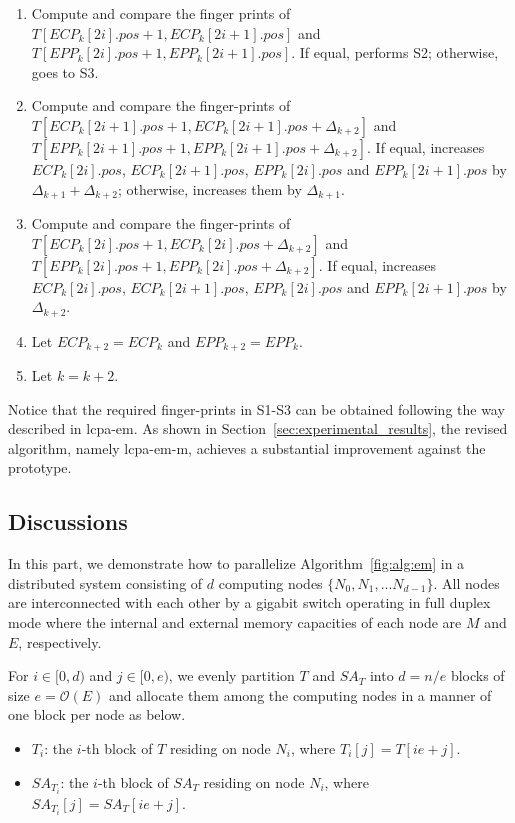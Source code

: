 \documentclass{llncs}
\begin{document}
\begin{enumerate}[S1.]
\item Compute and compare the finger prints of $T[ECP_k[2i].pos+1,ECP_k[2i+1].pos]$ and $T[EPP_k[2i].pos+1,EPP_k[2i+1].pos]$. If equal, performs S2; otherwise, goes to S3.
\item Compute and compare the finger-prints of $T[ECP_k[2i+1].pos+1,ECP_k[2i+1].pos+\Delta_{k+2}]$ and $T[EPP_k[2i+1].pos+1,EPP_k[2i+1].pos+\Delta_{k+2}]$. If equal, increases $ECP_k[2i].pos$, $ECP_k[2i+1].pos$, $EPP_k[2i].pos$ and $EPP_k[2i+1].pos$ by $\Delta_{k+1}+\Delta_{k+2}$; otherwise, increases them by $\Delta_{k+1}$.
\item Compute and compare the finger-prints of $T[ECP_k[2i].pos+1,ECP_k[2i].pos+\Delta_{k+2}]$ and $T[EPP_k[2i].pos+1,EPP_k[2i].pos+\Delta_{k+2}]$. If equal, increases $ECP_k[2i].pos$, $ECP_k[2i+1].pos$, $EPP_k[2i].pos$ and $EPP_k[2i+1].pos$ by $\Delta_{k+2}$.
\item Let $ECP_{k+2}=ECP_{k}$ and $EPP_{k+2}=EPP_{k}$.
\item Let $k = k+2$.
\end{enumerate}

Notice that the required finger-prints in S1-S3 can be obtained following the way described in {lcpa-em}. As shown in Section~\ref{sec:experimental_results}, the revised algorithm, namely {lcpa-em-m}, achieves a substantial improvement against the prototype.

\subsection{Discussions}\label{subsec:discussions}

In this part, we demonstrate how to parallelize Algorithm~\ref{fig:alg:em} in a distributed system consisting of $d$ computing nodes $\{N_0, N_1, ...N_{d-1}\}$. All nodes are interconnected with each other by a gigabit switch operating in full duplex mode where the internal and external memory capacities of each node are $M$ and $E$, respectively.

For $i\in [0,d)$ and $j\in [0,e)$, we evenly partition $T$ and $SA_T$ into $d=n/e$ blocks of size $e=\mathcal{O}(E)$ and allocate them among the computing nodes in a manner of one block per node as below.

\begin{itemize}
\item $T_i$: the $i$-th block of $T$ residing on node $N_i$, where $T_i[j] = T[ie+j]$.
\item $SA_{T_i}$: the $i$-th block of $SA_T$ residing on node $N_i$, where $SA_{T_i}[j] = SA_T[ie+j]$.
\end{itemize}
\end{document}
